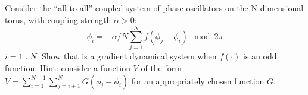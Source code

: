 \documentclass[12pt]{report}
\begin{document}
\newpage



\begin{problem}
    Consider the ``all-to-all'' coupled system of phase oscillators on the N-dimensional torus, with coupling strength $\alpha>0$:
    \begin{equation*}
   \dot \phi_i = - \alpha/N \sum_{j=1}^N f(\phi_j - \phi_i) \mod 2 \pi  
   \end{equation*}
   $i=1...N$.  Show that is a gradient dynamical system when $f(\cdot)$ is an odd function.  Hint:  consider a function $V$ of the form $V = \sum_{i=1}^{N-1} \sum_{j=i+1}^{N} G(\phi_j - \phi_i)$ for an appropriately chosen function $G$. 
\end{problem}
\end{document}
